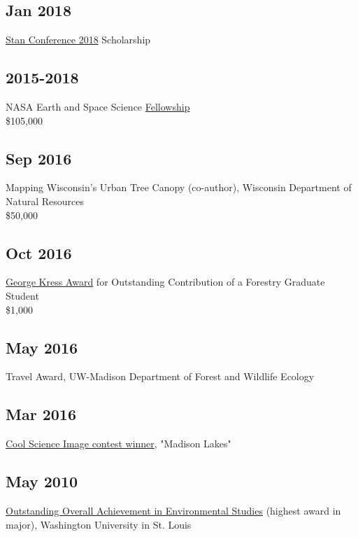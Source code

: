\documentclass{article}
\begin{document}
\subsection*{Jan 2018}
\label{sec:orgd77ac89}
\href{http://mc-stan.org/events/}{Stan Conference 2018} Scholarship

\subsection*{2015-2018}
\label{sec:orged818f4}
NASA Earth and Space Science \href{https://nspires.nasaprs.com/external/viewrepositorydocument/cmdocumentid=459947/solicitationId=\%7BB6CDCEA6-8EDD-A48A-FAF8-E588F66661C3\%7D/viewSolicitationDocument=1/NESSF15\%20selections.pdf}{Fellowship}\\
\$105,000

\subsection*{Sep 2016}
\label{sec:org4df9b91}
Mapping Wisconsin's Urban Tree Canopy (co-author), Wisconsin
Department of Natural Resources\\
\$50,000

\subsection*{Oct 2016}
\label{sec:orgb652f8b}
\href{https://kb.wisc.edu/russell/page.php?id=65402}{George Kress Award} for Outstanding Contribution of a Forestry Graduate
Student \\
\$1,000

\subsection*{May 2016}
\label{sec:orgc1774b1}
Travel Award, UW-Madison Department of Forest and Wildlife Ecology\\

\subsection*{Mar 2016}
\label{sec:org4d50f66}
\href{http://news.wisc.edu/cool-science-images-2016/\#\&gid=1\&pid=10}{Cool Science Image contest winner}, "Madison Lakes" \\

\subsection*{May  2010}
\label{sec:org387a87e}
\href{http://enst.wustl.edu/program/awards}{Outstanding Overall Achievement in Environmental Studies} (highest
award in major), Washington University in St. Louis
\end{document}
